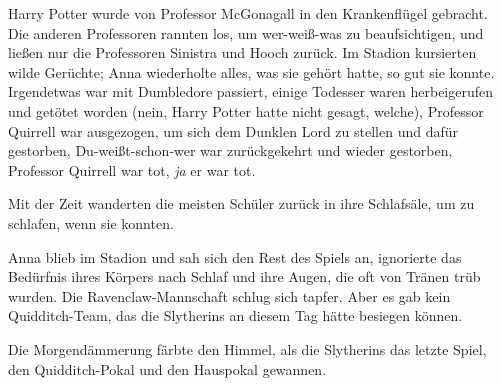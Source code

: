 Harry Potter wurde von Professor McGonagall in den Krankenflügel gebracht.
Die anderen Professoren rannten los, um wer-weiß-was zu beaufsichtigen, und ließen nur die Professoren Sinistra und Hooch zurück. Im Stadion kursierten wilde Gerüchte; Anna wiederholte alles, was sie gehört hatte, so gut sie konnte. Irgendetwas war mit Dumbledore passiert, einige Todesser waren herbeigerufen und getötet worden (nein, Harry Potter hatte nicht gesagt, welche), Professor Quirrell war ausgezogen, um sich dem Dunklen Lord zu stellen und dafür gestorben, Du-weißt-schon-wer war zurückgekehrt und wieder gestorben, Professor Quirrell war tot, \emph{ja} er war tot.

Mit der Zeit wanderten die meisten Schüler zurück in ihre Schlafsäle, um zu schlafen, wenn sie konnten.

Anna blieb im Stadion und sah sich den Rest des Spiels an, ignorierte das Bedürfnis ihres Körpers nach Schlaf und ihre Augen, die oft von Tränen trüb wurden.
Die Ravenclaw-Mannschaft schlug sich tapfer. Aber es gab kein Quidditch-Team, das die Slytherins an diesem Tag hätte besiegen können.

Die Morgendämmerung färbte den Himmel, als die Slytherins das letzte Spiel, den Quidditch-Pokal und den Hauspokal gewannen.

